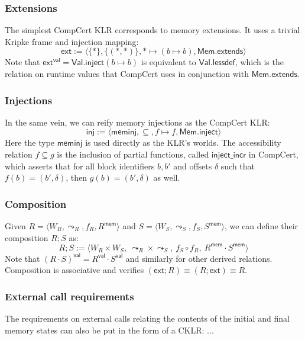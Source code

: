 \documentclass[acmsmall,timestamp,review]{acmart}
\newcommand{\kw}[1]{\ensuremath{ \mathsf{#1} }}
\begin{document}
\subsubsection{Extensions}

The simplest CompCert KLR corresponds to memory extensions.
It uses a trivial Kripke frame and injection mapping:
\[
  \kw{ext} :=
    \langle \{*\}, \{(*,*)\}, * \mapsto (b \mapsto b), \kw{Mem.extends} \rangle
\]
Note that $\kw{ext}^\kw{val} = \kw{Val.inject}(b \mapsto b)$
is equivalent to $\kw{Val.lessdef}$,
which is the relation on runtime values that
CompCert uses in conjunction with \kw{Mem.extends}.

\subsubsection{Injections}

In the same vein,
we can reify memory injections as the CompCert KLR:
\[
  \kw{inj} :=
    \langle
      \kw{meminj},
      {\subseteq}, %
      f \mapsto f,
      \kw{Mem.inject}
    \rangle
\]
Here the type \kw{meminj} is used directly
as the KLR's worlds.
The accessibility relation $f \subseteq g$
is the inclusion of partial functions,
called $\kw{inject\_incr}$ in CompCert,
which asserts that for all block identifiers $b, b'$ and offsets $\delta$
such that $f(b) = (b', \delta)$,
then $g(b) = (b', \delta)$ as well.

\subsubsection{Composition}

Given
$R = \langle W_R, {\leadsto}_R, f_R, R^\kw{mem} \rangle$ and
$S = \langle W_S, {\leadsto}_S, f_S, S^\kw{mem} \rangle$,
we can define
their composition $R ; S$ as:
\[
  R ; S := \langle
    W_R \times W_S, \:
    {\leadsto}_R \times {\leadsto}_S, \:
    f_S \circ f_R, \:
    R^\kw{mem} \cdot S^\kw{mem}
  \rangle
\]
Note that
$(R \cdot S)^\kw{val} = R^\kw{val} \cdot S^\kw{val}$
and similarly for other derived relations.
Composition is associative
and verifies $(\kw{ext} ; R) \equiv (R ; \kw{ext}) \equiv R$.

\subsubsection{External call requirements}

The requirements on external calls
relating the contents of the initial and final memory states
can also be put in the form of a CKLR:
...
\end{document}
